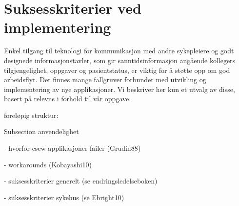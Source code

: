\section{Suksesskriterier ved implementering}
\label{chp: suksesskriterier}


\noindent
Enkel tilgang til teknologi for kommunikasjon med andre sykepleiere og godt designede informasjonstavler, som gir sanntidsinformasjon angående kollegers tilgjengelighet, oppgaver og pasientstatus, er viktig for å støtte opp om god arbeidsflyt\cite{Ebright10}. Det finnes  mange fallgruver forbundet med utvikling og implementering av nye applikasjoner. Vi beskriver her kun et utvalg av disse, basert på relevns i forhold til vår oppgave.


foreløpig struktur:

Subsection anvendelighet


- hvorfor cscw applikasjoner failer (Grudin88)

- workarounds (Kobayashi10)

- suksesskriterier generelt (se endringsledelseboken)

- suksesskriterier sykehus (se Ebright10)

\noindent



